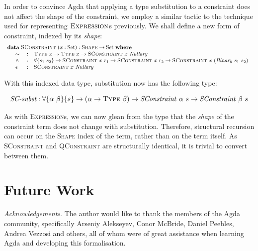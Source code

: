 \documentclass[a4paper]{jfp}
\begin{document}
In order to convince Agda that applying a type substitution to a constraint does not affect the shape of the constraint, we employ a similar tactic to
the technique used for representing $\textsc{Expression}$s previously. We shall define a new form of constraint, indexed by its \emph{shape}:
\begin{displaymath}
   \begin{array}{l}
      \textbf{data}\ \textsc{SConstraint}\ (x : \text{Set}) : \textsc{Shape} \rightarrow \text{Set}\ \textbf{where} \\
      \quad \begin{array}{lll}
      \sim\ & : & \textsc{Type}\ x \rightarrow \textsc{Type}\ x \rightarrow \textsc{SConstraint}\ x\ \mathit{Nullary} \\ 
      \land & : & \forall \{s_1\ s_2\} \rightarrow \textsc{SConstraint}\ x\ r_1 \rightarrow \textsc{SConstraint}\ x\ r_2 
                  \rightarrow \textsc{SConstraint}\ x\ (\mathit{Binary}\ s_1\  s_2) \\
      \epsilon\ & : & \textsc{SConstraint}\ x\ \mathit{Nullary}
      \end{array}
   \end{array}
\end{displaymath}

With this indexed data type, substitution now has the following type:

\begin{displaymath}
   \textit{SC-subst} : \forall \{ \alpha\ \beta \}\{ s \} \rightarrow (\alpha \rightarrow \textsc{Type}\ \beta) 
                     \rightarrow \mathit{SConstraint}\ \alpha\ s \rightarrow \mathit{SConstraint}\ \beta\ s
\end{displaymath}

As with \textsc{Expression}s, we can now glean from the type that the \emph{shape} of the constraint term does not change with substitution.
Therefore, structural recursion can occur on the \textsc{Shape} index of the  term, rather than on the term itself. As
\textsc{SConstraint} and \textsc{QConstraint} are structurally identical, it is trivial to convert between them.

\newpage
\section{Future Work}

\emph{Acknowledgements}. The author would like to thank the members of the Agda community, specifically Arseniy Alekseyev, Conor McBride, Daniel
Peebles, Andrea Vezzosi and others, all of whom were of great assistance when learning Agda and developing this formalisation.

\bigskip


	
\end{document}
